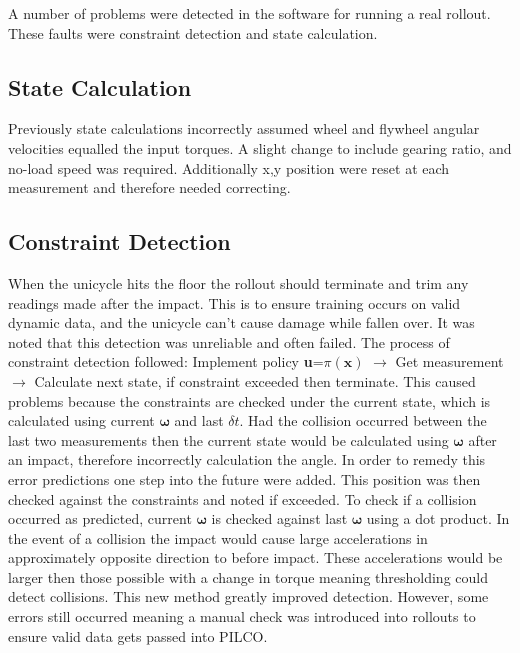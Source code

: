 \documentclass[twoside,twocolumn,12pt]{article}
\begin{document}
\clearpage
{}
A number of problems were detected in the software for running a real rollout. These faults were constraint detection and state calculation. 
\subsection{State Calculation}
Previously state calculations incorrectly assumed wheel and flywheel angular velocities equalled the input torques. A slight change to include gearing ratio, and no-load speed was required. Additionally x,y position were reset at each measurement and therefore needed correcting.
\subsection{Constraint Detection}
When the unicycle hits the floor the rollout should terminate and trim any readings made after the impact. This is to ensure training occurs on valid dynamic data, and the unicycle can't cause damage while fallen over. It was noted that this detection was unreliable and often failed.
\newline
The process of constraint detection followed: Implement policy \textbf{u}=$\pi (\textbf{x})$ $\rightarrow$ Get measurement $\rightarrow$ Calculate next state, if constraint exceeded then terminate. This caused problems because the constraints are checked under the current state, which is calculated using current $\boldsymbol{ \omega }$ and last $\delta t$. Had the collision occurred between the last two measurements then the current state would be calculated using $\boldsymbol{\omega}$ after an impact, therefore incorrectly calculation the angle.
\newline
In order to remedy this error predictions one step into the future were added. This position was then checked against the constraints and noted if exceeded. To check if a collision occurred as predicted, current $\boldsymbol{\omega}$ is checked against last $\boldsymbol{\omega}$ using a dot product. In the event of a collision the impact would cause large accelerations in approximately opposite direction to before impact. These accelerations would be larger then those possible with a change in torque meaning thresholding could detect collisions.
\newline
This new method greatly improved detection. However, some errors still occurred meaning a manual check was introduced into rollouts to ensure valid data gets passed into PILCO. 
\end{document}
